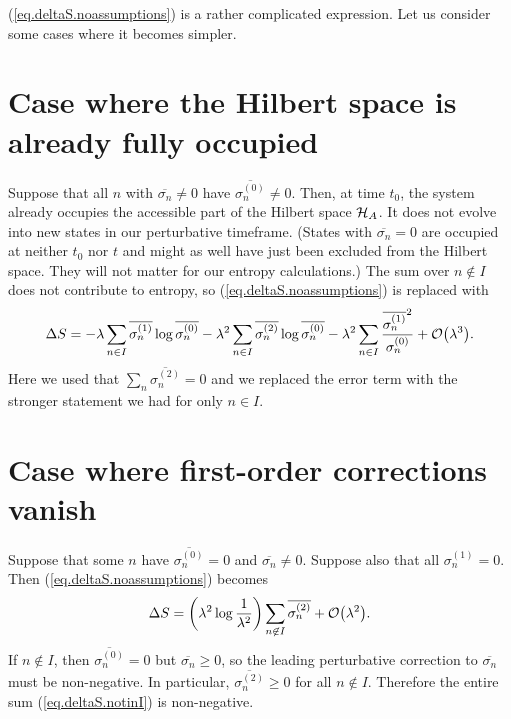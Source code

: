 (\ref{eq.deltaS.noassumptions}) is a rather complicated expression. Let us consider some cases where it becomes simpler.

\section{Case where the Hilbert space is already fully occupied}\label{sec.all.sigma.nonzero}

Suppose that all \(n\) with \(\overline{\sigma_n} \neq 0\) have \(\overline{\sigma_n^{(0)}} \neq 0\).
Then, at time \(t_0\), the system already occupies the accessible part of the Hilbert space \(\mathcal{H}_A\). It does not evolve into new states in our perturbative timeframe. (States with \(\overline{\sigma_n} = 0\) are occupied at neither \(t_0\) nor \(t\) and might as well have just been excluded from the Hilbert space. They will not matter for our entropy calculations.) The sum over \(n \not\in I\) does not contribute to entropy, so (\ref{eq.deltaS.noassumptions}) is replaced with
\begin{equation}
\Delta S = 
-\lambda \sum_{n \in I}\overline{\sigma_n^{(1)}}\log\overline{\sigma_n^{(0)}}- \lambda^2 \sum_{n \in I}\overline{\sigma_n^{(2)}}\log\overline{\sigma_n^{(0)}} - \lambda^2 \sum_{n \in I}\frac{\overline{\sigma_n^{(1)}}^2}{\sigma_n^{(0)}}+ \mathcal{O}{\left(\lambda^{3}\right)}.
\end{equation}
Here we used that \(\sum_{n}\overline{\sigma_n^{(2)}} = 0\) and we replaced the error term with the stronger statement we had for only \(n \in I\).

\section{Case where first-order corrections vanish}

Suppose that some \(n\) have \(\overline{\sigma_n^{(0)}} = 0\) and \(\overline{\sigma_n} \neq 0\). Suppose also that all \(\sigma_n^{(1)} = 0\). Then  (\ref{eq.deltaS.noassumptions}) becomes
\begin{equation}\label{eq.deltaS.notinI}
\Delta S = \left(\lambda^2\log\frac{1}{\lambda^{2}} \right)\sum_{n \not\in I} \overline{\sigma_n^{(2)}} + \mathcal{O}{\left(\lambda^2\right)}.
\end{equation}
If \(n \not\in I\), then \(\overline{\sigma_n^{(0)}} = 0\) but \(\overline{\sigma_n}\geq 0\), so the leading perturbative correction to \(\overline{\sigma_n}\) must be non-negative. In particular, \(\overline{\sigma_n^{(2)}} \geq 0\) for all \(n \not\in I\). Therefore the entire sum (\ref{eq.deltaS.notinI}) is non-negative.

